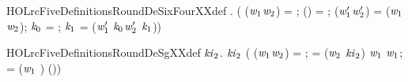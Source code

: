 \begin{SaveVerbatim}{HOLrcFiveDefinitionsRoundDeSixFourXXdef}
\HOLTokenTurnstile{} \HOLSymConst{\HOLTokenForall{}}  .
         \HOLSymConst{=}
     (
        (\ensuremath{\HOLBoundVar{w}\sb{\mathrm{1}}}\HOLSymConst{,}\ensuremath{\HOLBoundVar{w}\sb{\mathrm{2}}}) =  ;
        (\HOLSymConst{,}\HOLSymConst{,}\HOLSymConst{,}\HOLSymConst{,}\HOLSymConst{,}) =   ;
        (\ensuremath{\HOLBoundVar{w}\sb{\mathrm{1}}\sp{\prime{}}}\HOLSymConst{,}\ensuremath{\HOLBoundVar{w}\sb{\mathrm{2}}\sp{\prime{}}}) =    (\ensuremath{\HOLBoundVar{w}\sb{\mathrm{1}}}\HOLSymConst{,}\ensuremath{\HOLBoundVar{w}\sb{\mathrm{2}}});
        \ensuremath{\HOLBoundVar{k}\sb{\mathrm{0}}} =   ;
        \ensuremath{\HOLBoundVar{k}\sb{\mathrm{1}}} =   
         (\ensuremath{\HOLBoundVar{w}\sb{\mathrm{1}}\sp{\prime{}}} \HOLSymConst{\ensuremath{-}} \ensuremath{\HOLBoundVar{k}\sb{\mathrm{0}}}\HOLSymConst{,}\ensuremath{\HOLBoundVar{w}\sb{\mathrm{2}}\sp{\prime{}}} \HOLSymConst{\ensuremath{-}} \ensuremath{\HOLBoundVar{k}\sb{\mathrm{1}}}))
\end{SaveVerbatim}
\newcommand{\HOLrcFiveDefinitionsRoundDeSixFourXXdef}{\UseVerbatim{HOLrcFiveDefinitionsRoundDeSixFourXXdef}}
\begin{SaveVerbatim}{HOLrcFiveDefinitionsRoundDeSgXXdef}
\HOLTokenTurnstile{} \HOLSymConst{\HOLTokenForall{}}  \ensuremath{\HOLBoundVar{ki}\sb{\mathrm{2}}}.
        \ensuremath{\HOLBoundVar{ki}\sb{\mathrm{2}}} \HOLSymConst{=}
     (
        (\ensuremath{\HOLBoundVar{w}\sb{\mathrm{1}}}\HOLSymConst{,}\ensuremath{\HOLBoundVar{w}\sb{\mathrm{2}}}) = ;
         = (\ensuremath{\HOLBoundVar{w}\sb{\mathrm{2}}} \HOLSymConst{\ensuremath{-}} \ensuremath{\HOLBoundVar{ki}\sb{\mathrm{2}}}) \HOLSymConst{\HOLTokenRor{}}  \ensuremath{\HOLBoundVar{w}\sb{\mathrm{1}}} \HOLSymConst{\HOLTokenEor{}} \ensuremath{\HOLBoundVar{w}\sb{\mathrm{1}}};
         = (\ensuremath{\HOLBoundVar{w}\sb{\mathrm{1}}} \HOLSymConst{\ensuremath{-}} ) \HOLSymConst{\HOLTokenRor{}}   \HOLSymConst{\HOLTokenEor{}} 
        (\HOLSymConst{,}))
\end{SaveVerbatim}
